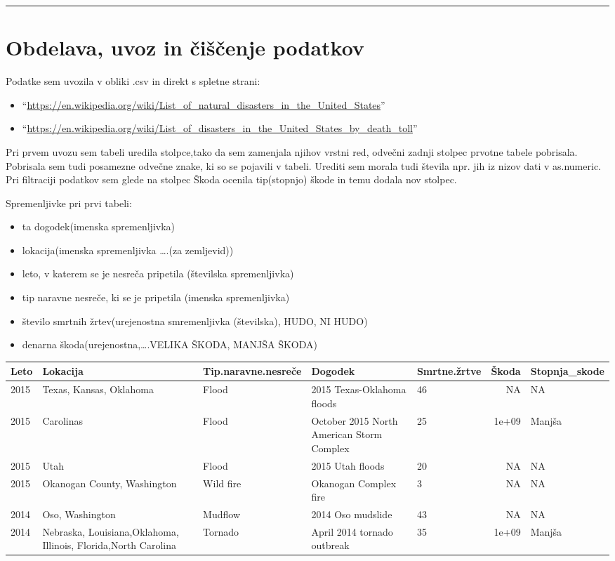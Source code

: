 \documentclass[]{article}
\begin{document}
\begin{center}\rule{0.5\linewidth}{\linethickness}\end{center}

\section{Obdelava, uvoz in čiščenje
podatkov}\label{obdelava-uvoz-in-ciscenje-podatkov}

Podatke sem uvozila v obliki .csv in direkt s spletne strani:

\begin{itemize}
\item
  ``\url{https://en.wikipedia.org/wiki/List_of_natural_disasters_in_the_United_States}''
\item
  ``\url{https://en.wikipedia.org/wiki/List_of_disasters_in_the_United_States_by_death_toll}''
\end{itemize}

Pri prvem uvozu sem tabeli uredila stolpce,tako da sem zamenjala njihov
vrstni red, odvečni zadnji stolpec prvotne tabele pobrisala. Pobrisala
sem tudi posamezne odvečne znake, ki so se pojavili v tabeli. Urediti
sem morala tudi števila npr. jih iz nizov dati v as.numeric. Pri
filtraciji podatkov sem glede na stolpec Škoda ocenila tip(stopnjo)
škode in temu dodala nov stolpec.

Spremenljivke pri prvi tabeli:

\begin{itemize}
\item
  ta dogodek(imenska spremenljivka)
\item
  lokacija(imenska spremenljivka \ldots{}.(za zemljevid))
\item
  leto, v katerem se je nesreča pripetila (številska spremenljivka)
\item
  tip naravne nesreče, ki se je pripetila (imenska spremenljivka)
\item
  število smrtnih žrtev(urejenostna smremenljivka (številska), HUDO, NI
  HUDO)
\item
  denarna škoda(urejenostna,\ldots{}.VELIKA ŠKODA, MANJŠA ŠKODA)
\end{itemize}

\begin{longtable}[c]{@{}lllllrl@{}}
\toprule
Leto & Lokacija & Tip.naravne.nesreče & Dogodek & Smrtne.žrtve & Škoda &
Stopnja\_skode\tabularnewline
\midrule
\endhead
2015 & Texas, Kansas, Oklahoma & Flood & 2015 Texas-Oklahoma floods & 46
& NA & NA\tabularnewline
2015 & Carolinas & Flood & October 2015 North American Storm Complex &
25 & 1e+09 & Manjša\tabularnewline
2015 & Utah & Flood & 2015 Utah floods & 20 & NA & NA\tabularnewline
2015 & Okanogan County, Washington & Wild fire & Okanogan Complex fire &
3 & NA & NA\tabularnewline
2014 & Oso, Washington & Mudflow & 2014 Oso mudslide & 43 & NA &
NA\tabularnewline
2014 & Nebraska, Louisiana,Oklahoma, Illinois, Florida,North Carolina &
Tornado & April 2014 tornado outbreak & 35 & 1e+09 &
Manjša\tabularnewline
\bottomrule
\end{longtable}
\end{document}
